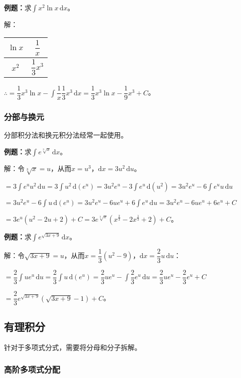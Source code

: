 \documentclass[UTF8, 12pt]{ctexart}
\begin{document}
\textbf{例题：}求$\int x^2\ln x\,\textrm{d}x$。\medskip

解：

\begin{tabular}{|c|c|}
    \hline
    $\ln x$ & $\dfrac{1}{x}$ \\ \hline
    $x^2$ & $\dfrac{1}{3}x^3$ \\
    \hline
\end{tabular} \medskip

$\therefore=\dfrac{1}{3}x^3\ln x-\displaystyle{\int\dfrac{1}{x}\dfrac{1}{3}x^3\,\textrm{d}x}=\dfrac{1}{3}x^3\ln x-\dfrac{1}{9}x^3+C$。

\subsubsection{分部与换元}

分部积分法和换元积分法经常一起使用。

\textbf{例题：}求$\int e^{\sqrt[3]{x}}\,\textrm{d}x$。

解：令$\sqrt[3]{x}=u$，从而$x=u^3$，$\textrm{d}x=3u^2\,\textrm{d}u$。

$=3\int e^uu^2\,\textrm{d}u=3\int u^2\,\textrm{d}(e^u)=3u^2e^u-3\int e^u\,\textrm{d}(u^2)=3u^2e^u-6\int e^uu\,\textrm{d}u$

$=3u^2e^u-6\int u\,\textrm{d}(e^u)=3u^2e^u-6ue^u+6\int e^u\,\textrm{d}u=3u^2e^u-6ue^u+6e^u+C$

$=3e^u(u^2-2u+2)+C=3e^{\sqrt[3]{x}}(x^{\frac{2}{3}}-2x^{\frac{1}{3}}+2)+C$。

\textbf{例题：}求$\int e^{\sqrt{3x+9}}\,\textrm{d}x$。

解：令$\sqrt{3x+9}=u$，从而$x=\dfrac{1}{3}(u^2-9)$，$\textrm{d}x=\dfrac{2}{3}u\,\textrm{d}u$：

$=\displaystyle{\dfrac{2}{3}\int ue^u\,\textrm{d}u=\dfrac{2}{3}\int u\,\textrm{d}(e^u)=\dfrac{2}{3}ue^u-\int\dfrac{2}{3}e^u\,\textrm{d}u=\dfrac{2}{3}ue^u-\dfrac{2}{3}e^u+C}$

$=\dfrac{2}{3}e^{\sqrt{3x+9}}(\sqrt{3x+9}-1)+C$。

\subsection{有理积分}

针对于多项式分式，需要将分母和分子拆解。

\subsubsection{高阶多项式分配}
\end{document}
